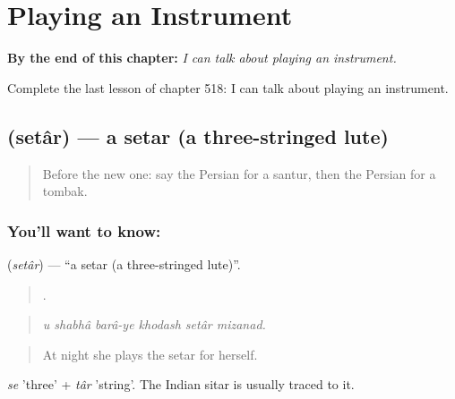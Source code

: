 
\chapter{Playing an Instrument}
\label{ch:fa-playing-an-instrument}

\begin{chapteropening}
\textbf{By the end of this chapter:} \emph{I can talk about playing an instrument.}

Complete the last lesson of chapter 518: I can talk about playing an instrument.
\end{chapteropening}

\section[\texorpdfstring{\fa{سه} \fa{تار} (setâr)}{سه تار (setâr)}]{  (setâr) — a setar (a three-stringed lute)}

\label{lesson:FA-C518-setar}



\begin{quote}
Before the new one: say the Persian for a santur, then the Persian for a tombak.
\end{quote}

\subsection*{You'll want to know:  }
\textbf{ } (\emph{setâr}) — \textquotedblleft{}a setar (a three-stringed lute)\textquotedblright{}.

\begin{quote}
      .
\end{quote}

\begin{quote}
\emph{u shabhâ barâ-ye khodash setâr mizanad.}
\end{quote}

\begin{quote}
At night she plays the setar for herself.
\end{quote}

\emph{se} 'three' + \emph{târ} 'string'. The Indian sitar is usually traced to it.

